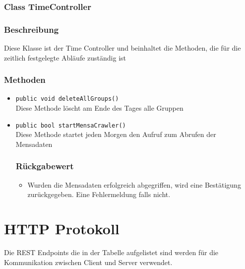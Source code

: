 \documentclass[a4paper]{scrreprt}
\begin{document}
\subsubsection{Class TimeController}
\subsubsection*{Beschreibung}
Diese Klasse ist der Time Controller und beinhaltet die Methoden, die für die zeitlich festgelegte Abläufe zuständig ist

\subsubsection*{Methoden}
\begin{addmargin}[25pt]{0pt}
\begin{itemize}

\item \texttt{public void deleteAllGroups()}\\
	Diese Methode löscht am Ende des Tages alle Gruppen
	
\item \texttt{public bool startMensaCrawler()}\\
	Diese Methode startet jeden Morgen den Aufruf zum Abrufen der Mensadaten
	\subsubsection*{Rückgabewert}
	\begin{itemize}
	\item Wurden die Mensadaten erfolgreich abgegriffen, wird eine Bestätigung zurückgegeben. Eine Fehlermeldung falls nicht.
	\end{itemize}

\end{itemize}
\end{addmargin}

\newpage
\section{HTTP Protokoll}

Die REST Endpoints die in der Tabelle aufgelistet sind werden für die Kommunikation zwischen Client und Server verwendet. \\
\end{document}
